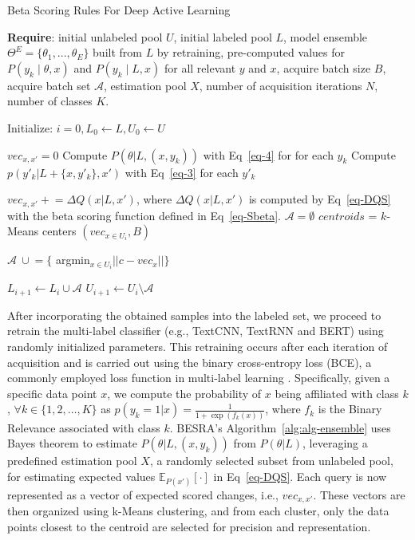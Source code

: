 \documentclass[letterpaper]{article} %
\begin{document}
\begin{algorithm}[tb]\small
\caption{Beta Scoring Rules For Deep Active Learning}
\label{alg:alg-ensemble}

\textbf{Require}: initial unlabeled pool $U$, initial labeled pool $L$, model ensemble $\Theta^E=\{\theta_1,...,\theta_E\}$ built from $L$ by retraining, pre-computed values for $P(y_k \mid \theta,x )$ and $P(y_k \mid L, x )$ for all relevant $y$ and $x$, acquire batch size $B$, acquire batch set $\mathcal{A}$, estimation pool $X$, number of acquisition iterations $N$, number of classes $K$.
\begin{algorithmic}[1]\small
\STATE Initialize: $i=0,L_0\leftarrow L, U_0\leftarrow U$


    \STATE  $vec_{x,x'} = 0$
    \STATE
    Compute $P(\theta|L,(x,y_k))$ with Eq~\eqref{eq-4} for for each $y_k$
    \STATE
    Compute $p(y'_k|L+\{x,y'_k\},x')$ with Eq~\eqref{eq-3} for each $y'_k$

    \ENDFOR
  \STATE $vec_{x,x'} +\!\!\!=
    \Delta Q(x|L,x')$, where $\Delta Q(x|L,x')$ is computed by Eq~\eqref{eq-DQS} with
    the beta scoring function defined in Eq~\eqref{eq-Sbeta}.
    \ENDFOR
    \STATE $\mathcal{A} = \emptyset$
    \STATE $centroids$ = $k$-Means centers $(vec_{x\in U_i}, B)$

    \STATE $\mathcal{A}  ~\cup\!\!= \{$ argmin$_{x \in U_i}||c - vec_{x}|| \}$
    \ENDFOR

        \STATE $L_{i+1}\leftarrow L_i \cup \mathcal{A} $
        \STATE $U_{i+1}\leftarrow U_i \setminus \mathcal{A} $

    \ENDWHILE
  \end{algorithmic}
\end{algorithm}

After incorporating the obtained samples into the labeled set, we proceed to retrain the multi-label classifier (e.g., TextCNN, TextRNN and BERT) using randomly initialized parameters. This retraining occurs after each iteration of acquisition and is carried out using the binary cross-entropy loss (BCE), a commonly employed loss function in multi-label learning \cite{9319440}.
Specifically,
given a specific data point $x$,
we compute the probability of $x$ being affiliated with class $k$,
$\forall k \in \{1, 2, \dots,  K\}$  as
$p(y_k = 1|x) = \frac{1}{1 + \exp(f_k(x))}$,
where $f_k$ is the Binary Relevance associated with class $k$.
BESRA's Algorithm~\ref{alg:alg-ensemble} uses Bayes theorem to estimate $P(\theta|L,(x,y_k))$ from $P(\theta|L)$, leveraging a predefined estimation pool $X$, a randomly selected subset from unlabeled pool, for estimating expected values $\mathbb{E}_{ P(x')}
[\cdot]$ in Eq~\eqref{eq-DQS}.
Each query is now represented as a vector of expected scored changes, i.e.,
$vec_{x,x'}$.
These vectors are then organized using k-Means clustering, and from each cluster, only the data points closest to the centroid are selected for precision and representation.
\end{document}
